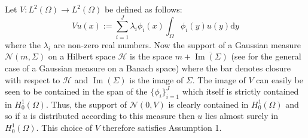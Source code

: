 Let $V:L^{2}(\Omega)\rightarrow L^{2}(\Omega)$ be defined as follows:
\begin{equation}
    \label{FEM_prior}
    Vu(x):=\sum_{i=1}^{J}\lambda_{i}\phi_{i}(x)\int_{\Omega}\phi_{i}(y)u(y)\mathrm{d}y
\end{equation}
where the $\lambda_{i}$ are non-zero real numbers. Now the support of a Gaussian measure $\mathcal{N}(m,\Sigma)$ on a Hilbert space $\mathcal{H}$ is the space $m+\overline{\operatorname{Im}(\Sigma)}$ (see \textcolor{blue}{\cite{vakhania1975topological}} for the general case of a Gaussian measure on a Banach space) where the bar denotes closure with respect to $\mathcal{H}$ and $\operatorname{Im}(\Sigma)$ is the image of $\Sigma$. The image of $V$ can easily be seen to be contained in the span of the $\{\phi_{i}\}_{i=1}^{J}$ which itself is strictly contained in $H_{0}^{1}(\Omega)$. Thus, the support of $\mathcal{N}(0,V)$ is clearly contained in $H_{0}^{1}(\Omega)$ and so if $u$ is distributed according to this measure then $u$ lies almost surely in $H_{0}^{1}(\Omega)$. This choice of $V$ therefore satisfies Assumption 1. \vspace{10pt}

